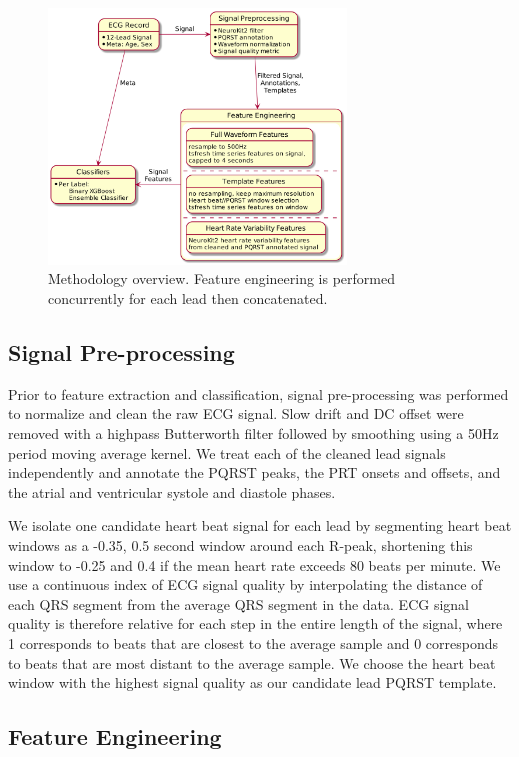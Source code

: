\documentclass[twocolumn]{cinc}
\begin{document}
\begin{figure}[ht]
  \centering
  \includegraphics[width=7.9cm]{fig/methodology.png}
  \caption{Methodology overview. Feature engineering is performed concurrently for each lead then concatenated.}
  \label{fig:methodology}
\end{figure}

\subsection{Signal Pre-processing}

Prior to feature extraction and classification, signal pre-processing was performed to normalize and clean the raw ECG signal.
Slow drift and DC offset were removed with a highpass Butterworth filter followed by smoothing using a 50Hz period moving average kernel.
We treat each of the cleaned lead signals independently and annotate the PQRST peaks, the PRT onsets and offsets, and the atrial and ventricular systole and diastole phases.

We isolate one candidate heart beat signal for each lead by segmenting heart beat windows as a -0.35, 0.5 second window around each R-peak, shortening this window to -0.25 and 0.4 if the mean heart rate exceeds 80 beats per minute.
We use a continuous index of ECG signal quality by interpolating the distance of each QRS segment from the average QRS segment in the data.
ECG signal quality is therefore relative for each step in the entire length of the signal, where 1 corresponds to beats that are closest to the average sample and 0 corresponds to beats that are most distant to the average sample.
We choose the heart beat window with the highest signal quality as our candidate lead PQRST template.

\subsection{Feature Engineering}
\end{document}
